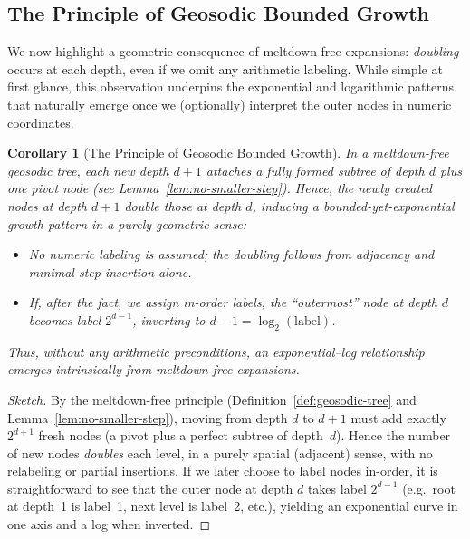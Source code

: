 \documentclass[acmsmall]{acmart}
\newtheorem{corollary}[theorem]{Corollary}
\theoremstyle{definition}
\theoremstyle{remark}
\begin{document}
 \subsection{The Principle of Geosodic Bounded Growth}
\label{subsec:bounded-growth}

We now highlight a geometric consequence of meltdown-free expansions:
\emph{doubling} occurs at each depth, even if we omit any arithmetic labeling.
While simple at first glance, this observation underpins the exponential
and logarithmic patterns that naturally emerge once we (optionally) interpret
the outer nodes in numeric coordinates.

\begin{corollary}[The Principle of Geosodic Bounded Growth]
\label{cor:geosodic-bounded-growth}
In a meltdown-free geosodic tree, each new depth $d+1$ attaches a fully formed
subtree of depth $d$ plus one pivot node (see Lemma~\ref{lem:no-smaller-step}).
Hence, the newly created nodes at depth $d+1$ \emph{double} those at depth $d$,
inducing a bounded-yet-exponential growth pattern in a purely \emph{geometric} sense:

\begin{itemize}
  \item No numeric labeling is assumed; the doubling follows from adjacency
  and minimal-step insertion alone.
  \item If, \emph{after the fact}, we assign in-order labels, the ``outermost''
  node at depth $d$ becomes label $2^{d-1}$, inverting to $d-1 = \log_2(\text{label})$.
\end{itemize}

Thus, without any arithmetic preconditions, an exponential--log relationship
emerges \emph{intrinsically} from meltdown-free expansions.
\end{corollary}

\begin{proof}[Sketch]
By the meltdown-free principle (Definition~\ref{def:geosodic-tree} and
Lemma~\ref{lem:no-smaller-step}), moving from depth $d$ to $d+1$ must
add exactly $2^{d+1}$ fresh nodes (a pivot plus a perfect subtree of depth~$d$).
Hence the number of new nodes \emph{doubles} each level, in a purely spatial
(adjacent) sense, with no relabeling or partial insertions.
If we later choose to label nodes in-order, it is straightforward
to see that the outer node at depth $d$ takes label $2^{d-1}$ (e.g.\ 
root at depth~1 is label~1, next level is label~2, etc.), yielding an
exponential curve in one axis and a log when inverted.
\end{proof}
\end{document}
